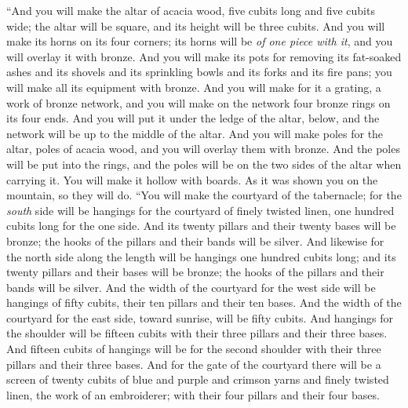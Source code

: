 \begin{biblechapter} %
 “And you will make the altar of acacia wood, five cubits long and five cubits wide; the altar will be square, and its height will be three cubits.
\verse And you will make its horns on its four corners; its horns will be \textit{of one piece with it}, and you will overlay it with bronze.
\verse And you will make its pots for removing its fat-soaked ashes and its shovels and its sprinkling bowls and its forks and its fire pans; you will make all its equipment with bronze.
\verse And you will make for it a grating, a work of bronze network, and you will make on the network four bronze rings on its four ends.
\verse And you will put it under the ledge of the altar, below, and the network will be up to the middle of the altar.
\verse And you will make poles for the altar, poles of acacia wood, and you will overlay them with bronze.
\verse And the poles will be put into the rings, and the poles will be on the two sides of the altar when carrying it.
\verse You will make it hollow with boards. As it was shown you on the mountain, so they will do.
 “You will make the courtyard of the tabernacle; for the \textit{south} side will be hangings for the courtyard of finely twisted linen, one hundred cubits long for the one side.
\verse And its twenty pillars and their twenty bases will be bronze; the hooks of the pillars and their bands will be silver.
\verse And likewise for the north side along the length will be hangings one hundred cubits long; and its twenty pillars and their bases will be bronze; the hooks of the pillars and their bands will be silver.
\verse And the width of the courtyard for the west side will be hangings of fifty cubits, their ten pillars and their ten bases.
\verse And the width of the courtyard for the east side, toward sunrise, will be fifty cubits.
\verse And hangings for the shoulder will be fifteen cubits with their three pillars and their three bases.
\verse And fifteen cubits of hangings will be for the second shoulder with their three pillars and their three bases.
\verse And for the gate of the courtyard there will be a screen of twenty cubits of blue and purple and crimson yarns and finely twisted linen, the work of an embroiderer; with their four pillars and their four bases.

\end{biblechapter}
